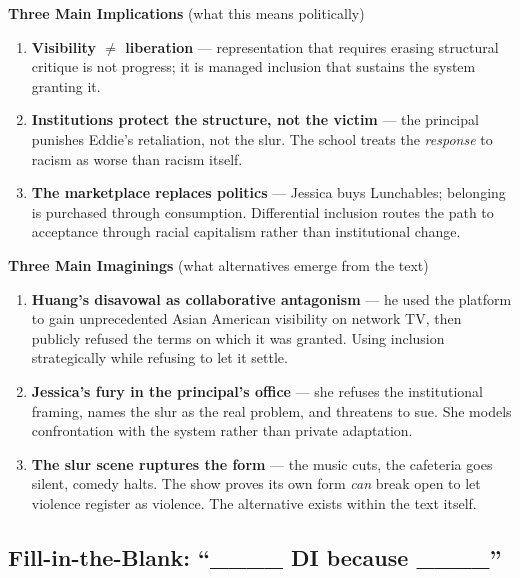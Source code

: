 \documentclass[12pt]{article}
\begin{document}
\vspace{8pt}

\textbf{Three Main Implications} {\small (what this means politically)}

\begin{enumerate}\setlength{\itemsep}{2pt}
\item \textbf{Visibility $\neq$ liberation} --- representation that requires erasing structural critique is not progress; it is managed inclusion that sustains the system granting it.
\item \textbf{Institutions protect the structure, not the victim} --- the principal punishes Eddie's retaliation, not the slur. The school treats the \textit{response} to racism as worse than racism itself.
\item \textbf{The marketplace replaces politics} --- Jessica buys Lunchables; belonging is purchased through consumption. Differential inclusion routes the path to acceptance through racial capitalism rather than institutional change.
\end{enumerate}

\vspace{8pt}

\textbf{Three Main Imaginings} {\small (what alternatives emerge from the text)}

\begin{enumerate}\setlength{\itemsep}{2pt}
\item \textbf{Huang's disavowal as collaborative antagonism} --- he used the platform to gain unprecedented Asian American visibility on network TV, then publicly refused the terms on which it was granted. Using inclusion strategically while refusing to let it settle.
\item \textbf{Jessica's fury in the principal's office} --- she refuses the institutional framing, names the slur as the real problem, and threatens to sue. She models confrontation with the system rather than private adaptation.
\item \textbf{The slur scene ruptures the form} --- the music cuts, the cafeteria goes silent, comedy halts. The show proves its own form \textit{can} break open to let violence register as violence. The alternative exists within the text itself.
\end{enumerate}

\vspace{14pt}
\subsection*{Fill-in-the-Blank: ``\_\_\_\_ DI because \_\_\_\_''}
\end{document}
